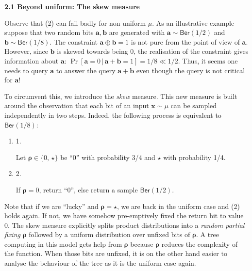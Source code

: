 \documentclass[10pt,a4paper]{article}
\begin{document}
\par\medskip\noindent\textbf{
2.1 Beyond uniform: The skew measure}\par




Observe that (2) can fail badly for non-uniform $\mu$. As an illustrative example suppose that two random bits $\bm{a},\bm{b}$ are generated with $\bm{a}\sim\mathsf{Ber}(1/2)$ and $\bm{b}\sim\mathsf{Ber}(1/8)$. The constraint $\bm{a}\oplus\bm{b}=1$ is not pure from the point of view of $\bm{a}$. However, since $\bm{b}$ is skewed towards being 0, the realisation of the constraint gives information about $\bm{a}$: $\Pr[\bm{a}=0\,|\,\bm{a}+\bm{b}=1]=1/8\ll 1/2$. Thus, it seems one needs to query $\bm{a}$ to answer the query $\bm{a}+\bm{b}$ even though the query is not critical for $\bm{a}$!\par




To circumvent this, we introduce the \emph{skew} measure. This new measure is built around the observation that each bit of an input $\bm{x}\sim\mu$ can be sampled independently in two steps. Indeed, the following process is equivalent to $\mathsf{Ber}(1/8)$:\par


\begin{enumerate}


\item[] 
1. 


Let $\bm{\rho}\in\{0,\,\star\}$ be “$0$” with probability 3/4 and $\star$ with probability 1/4.\par





\item[] 
2. 


If $\bm{\rho}=0$, return “$0$”, else return a sample $\mathsf{Ber}(1/2)$.\par





\end{enumerate}


Note that if we are “lucky” and $\bm{\rho}=\star$, we are back in the uniform case and (2) holds again. If not, we have somehow pre-emptively fixed the return bit to value $0$. The skew measure explicitly splits product distributions into a \emph{random partial fixing} $\bm{\rho}$ followed by a uniform distribution over unfixed bits of $\bm{\rho}$. A tree computing in this model gets help from $\bm{\rho}$ because $\bm{\rho}$ reduces the complexity of the function. When those bits are unfixed, it is on the other hand easier to analyse the behaviour of the tree as it is the uniform case again.\par
\end{document}
